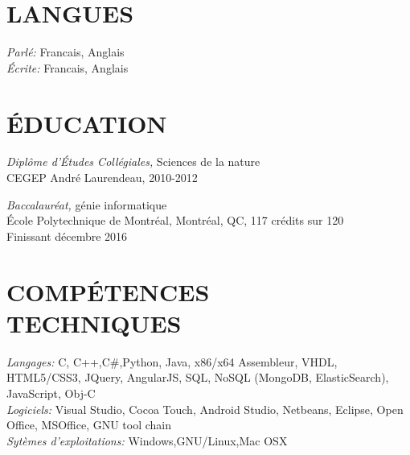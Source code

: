 \documentclass[margin, 10pt]{res} %
\begin{document}
\begin{resume}


\section{LANGUES}

{\sl Parl\'e:} Francais, Anglais \\
{\sl \'Ecrite:} Francais, Anglais


\section{\'EDUCATION}

{\sl Dipl\^ome d'\'Etudes Coll\'egiales,} Sciences de la nature \\
CEGEP Andr\'e Laurendeau, 2010-2012 

{\sl Baccalaur\'eat,} g\'enie informatique \\
\'Ecole Polytechnique de Montr\'eal, Montr\'eal, QC, 117 cr\'edits sur 120\\
Finissant d\'ecembre 2016
 

\section{COMP\'ETENCES\\ TECHNIQUES} 

{\sl Langages:} 
C, C++,C\#,Python, Java, x86/x64 Assembleur, VHDL, HTML5/CSS3, JQuery, AngularJS, SQL, NoSQL (MongoDB, ElasticSearch), JavaScript, Obj-C \\
{\sl Logiciels:} 
Visual Studio, Cocoa Touch, Android Studio, Netbeans, Eclipse, Open Office, MSOffice, GNU tool chain \\
{\sl Syt\`emes d'exploitations:} Windows,GNU/Linux,Mac OSX


\end{resume}
\end{document}
